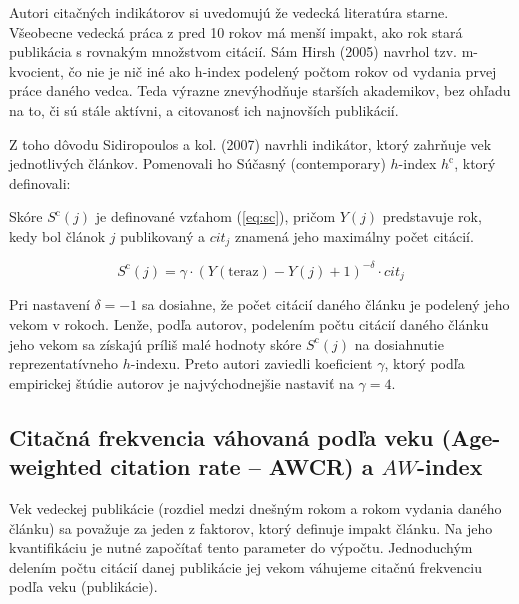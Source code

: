 Autori citačných indikátorov si uvedomujú že vedecká literatúra
starne. Všeobecne vedecká práca z pred 10 rokov má menší impakt, ako rok stará
publikácia s rovnakým množstvom citácií. Sám Hirsh (2005) navrhol
tzv. m-kvocient, čo nie je nič iné ako h-index podelený počtom rokov od vydania
prvej práce daného vedca. Teda výrazne znevýhodňuje starších akademikov, bez
ohľadu na to, či sú stále aktívni, a citovanosť ich najnovších publikácií.

Z toho dôvodu Sidiropoulos a kol. (2007) navrhli indikátor, ktorý zahrňuje vek
jednotlivých článkov. Pomenovali ho Súčasný (contemporary) $h$-index $h^{\mathrm{c}}$, ktorý
definovali:


Skóre $S^{\mathrm{c}}(j)$ je definované vzťahom (\ref{eq:sc}), pričom $Y(j)$
predstavuje rok, kedy bol článok $j$ publikovaný a $\mathit{cit}_j$ znamená jeho
maximálny počet citácií.

\begin{equation}
\label{eq:sc}
S^{\mathrm{c}}(j) = \gamma\cdot (Y(\mathrm{teraz}) - Y(j) + 1)^{-\delta}\cdot \mathit{cit}_j
\end{equation}

Pri nastavení $\delta = -1$ sa dosiahne, že počet citácií daného článku je
podelený jeho vekom v rokoch. Lenže, podľa autorov, podelením počtu citácií
daného článku jeho vekom sa získajú príliš malé hodnoty skóre
$S^{\mathrm{c}}(j)$ na dosiahnutie reprezentatívneho $h$-indexu. Preto autori
zaviedli koeficient $\gamma$, ktorý podľa empirickej štúdie autorov je
najvýchodnejšie nastaviť na $\gamma = 4$.

\subsection{Citačná frekvencia váhovaná podľa veku (Age-weighted citation rate
  -- AWCR) a $\mathit{AW}$-index}

Vek vedeckej publikácie (rozdiel medzi dnešným rokom a rokom vydania daného
článku) sa považuje za jeden z faktorov, ktorý definuje impakt článku. Na jeho
kvantifikáciu je nutné započítať tento parameter do výpočtu. Jednoduchým delením
počtu citácií danej publikácie jej vekom váhujeme citačnú frekvenciu podľa veku
(publikácie).

